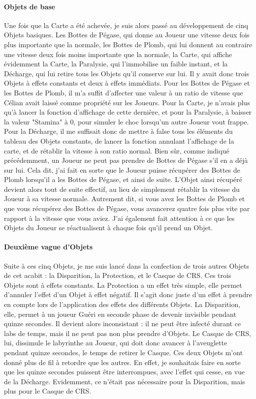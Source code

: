 \documentclass{article}
\begin{document}
\paragraph{Objets de base}
Une fois que la Carte a été achevée, je suis alors passé au développement de cinq Objets basiques. Les Bottes de Pégase, qui donne au Joueur une vitesse deux fois plus importante que la normale, les Bottes de Plomb, qui lui donnent au contraire une vitesse deux fois moins importante que la normale, la Carte, qui affiche évidemment la Carte, la Paralysie, qui l'immobilise un faible instant, et la Décharge, qui lui retire tous les Objets qu'il conserve sur lui. Il y avait donc trois Objets à effets constants et deux à effets immédiats. Pour les Bottes de Pégase et les Bottes de Plomb, il m'a suffit d'affecter une valeur à un ratio de vitesse que Célian avait laissé comme propriété sur les Joueurs. Pour la Carte, je n'avais plus qu'à lancer la fonction d'affichage de cette dernière, et pour la Paralysie, à baisser la valeur "Stamina" à 0, pour simuler le choc lorsqu'un autre Joueur vout frappe. Pour la Décharge, il me suffisait donc de mettre à false tous les éléments du tableau des Objets constants, de lancer la fonction annulant l'affichage de la carte, et de rétablir la vitesse à son ratio normal. Bien sûr, comme indiqué précédemment, un Joueur ne peut pas prendre de Bottes de Pégase s'il en a déjà sur lui. Cela dit, j'ai fait en sorte que le Joueur puisse récupérer des Bottes de Plomb lorsqu'il a les Bottes de Pégase, et ainsi de suite. L'Objet ainsi récupéré devient alors tout de suite effectif, au lieu de simplement rétablir la vitesse du Joueur à sa vitesse normale. Autrement dit, si vous avez les Bottes de Plomb et que vous récupérez des Bottes de Pégase, vous avancerez quatre fois plus vite par rapport à la vitesse que vous aviez. J'ai également fait attention à ce que les Objets du Joueur se réactualisent à chaque fois qu'il prend un Objet.

\paragraph{Deuxième vague d'Objets}
Suite à ces cinq Objets, je me suis lancé dans la confection de trois autres Objets de cet acabit : la Disparition, la Protection, et le Casque de CRS. Ces trois Objets sont à effets constants. La Protection a un effet très simple, elle permet d'annuler l'effet d'un Objet à effet négatif. Il s'agit donc juste d'un effet à prendre en compte lors de l'application des effets des différents Objets. La Disparition, elle, permet à un joueur Guéri en seconde phase de devenir invisible pendant quinze secondes. Il devient alors inconsistant : il ne peut être infecté durant ce labs de temps, mais il ne peut pas non plus prendre d'Objets. Le Casque de CRS, lui, dissimule le labyrinthe au Joueur, qui doit donc avancer à l'aveuglette pendant quinze secondes, le temps de retirer le Casque. Ces deux Objets m'ont donné plus de fil à retordre que les autres. En effet, je souhaitais faire en sorte que les quinze secondes puissent être interrompues, avec l'effet qui cesse, en vue de la Décharge. Evidemment, ce n'était pas nécessaire pour la Disparition, mais plus pour le Casque de CRS. 
\end{document}
